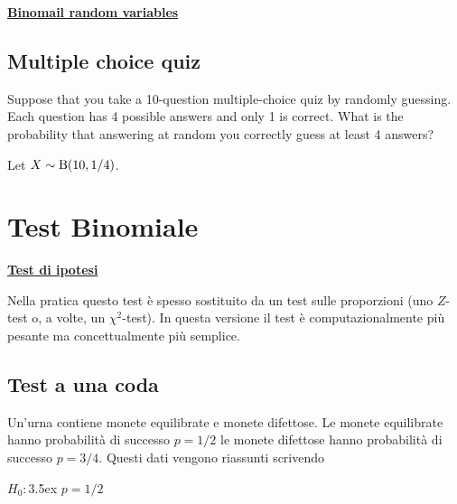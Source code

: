 \documentclass[11pt,openany]{book}
\begin{document}
\clearpage
\hfill\textbf{{\color{brown}\hyperref[Binomial_rv]{Binomail random variables} \faShare}}
\subsection{Multiple choice quiz}
\label{esame_a_scelte_multiple}
Suppose that you take a 10-question multiple-choice quiz by randomly guessing. Each question has 4 possible answers and only 1 is correct. What is the probability that answering at random you correctly guess at least 4 answers?


\begin{soluzione}

Let $X\sim{\rm B}(10,1/4)$.



\end{soluzione}


\clearpage\section{Test Binomiale}
\hfill\textbf{{\color{brown}\hyperref[test_ipotesi]{Test di ipotesi \faShare}}}

\def\medrel#1{\parbox[t]{6ex}{$\displaystyle\hfil #1$}}
\def\ceq#1#2#3{\parbox[t]{18ex}{$\displaystyle #1$}\medrel{#2}$\displaystyle  #3$}

Nella pratica questo test è spesso sostituito da un test sulle proporzioni (uno $Z$-test o, a volte, un $\chi^2$-test). In questa versione il test è computazionalmente più pesante ma concettualmente più semplice.

\subsection{Test a una coda}\label{Bernoulli_test}

Un'urna contiene monete equilibrate e monete difettose. 
Le monete equilibrate hanno probabilità di successo $p=1/2$ le monete difettose hanno probabilità di successo $p=3/4$. 
Questi dati vengono riassunti scrivendo

$H_0:$\kern3.5ex $p=1/2$
\end{document}
